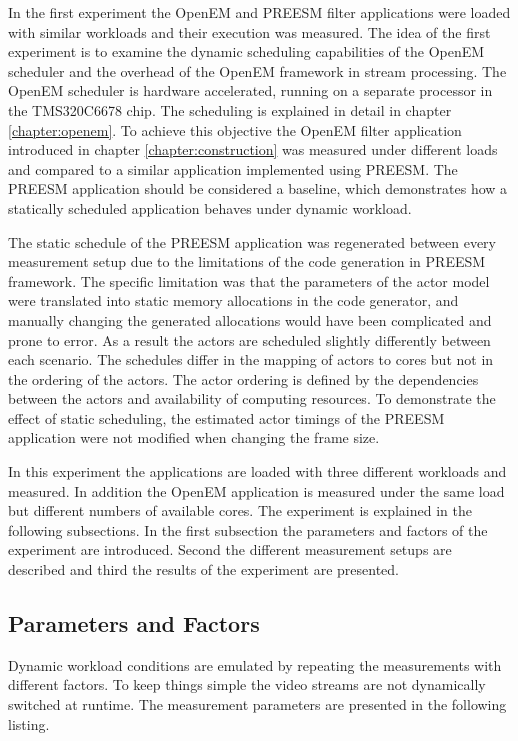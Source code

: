 In the first experiment the OpenEM and PREESM filter applications were loaded with similar workloads and their execution was measured. The idea of the first experiment is to examine the dynamic scheduling capabilities of the OpenEM scheduler and the overhead of the OpenEM framework in stream processing. The OpenEM scheduler is hardware accelerated, running on a separate processor in the TMS320C6678 chip. The scheduling is explained in detail in chapter \ref{chapter:openem}. To achieve this objective the OpenEM filter application introduced in chapter \ref{chapter:construction} was measured under different loads and compared to a similar application implemented using PREESM. The PREESM application should be considered a baseline, which demonstrates how a statically scheduled application behaves under dynamic workload.

The static schedule of the PREESM application was regenerated between every measurement setup due to the limitations of the code generation in PREESM framework. The specific limitation was that the parameters of the actor model were translated into static memory allocations in the code generator, and manually changing the generated allocations would have been complicated and prone to error. As a result the actors are scheduled slightly differently between each scenario. The schedules differ in the mapping of actors to cores but not in the ordering of the actors. The actor ordering is defined by the dependencies between the actors and availability of computing resources. To demonstrate the effect of static scheduling, the estimated actor timings of the PREESM application were not modified when changing the frame size. 

In this experiment the applications are loaded with three different workloads and measured. In addition the OpenEM application is measured under the same load but different numbers of available cores. The experiment is explained in the following subsections. In the first subsection the parameters and factors of the experiment are introduced. Second the different measurement setups are described and third the results of the experiment are presented.

\subsection{Parameters and Factors}
Dynamic workload conditions are emulated by repeating the measurements with different factors. To keep things simple the video streams are not dynamically switched at runtime. The measurement parameters are presented in the following listing.

